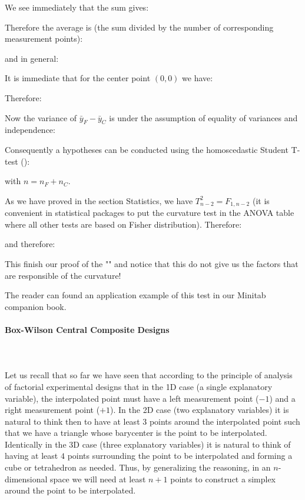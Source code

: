 	We see immediately that the sum gives:
	
	Therefore the average is (the sum divided by the number of corresponding measurement points):
	
	and in general:
	
	It is immediate that for the center point $(0,0)$ we have:
	
	Therefore:
	
	Now the variance of $\bar{y}_F-\bar{y}_C$ is under the assumption of equality of variances and independence:
	
	Consequently a hypotheses can be conducted using the homoscedastic Student T-test ():
	
	with $n=n_F+n_C$.
	
	As we have proved in the section Statistics, we have $T_{n-2}^2=F_{1,n-2}$ (it is convenient in statistical packages to put the curvature test in the ANOVA table where all other tests are based on Fisher distribution). Therefore:
	
	and therefore:
	
	This finish our proof of the "" and notice that this do not give us the factors that are responsible of the curvature!
	
	The reader can found an application example of this test in our Minitab companion book.
	
	\pagebreak
	\paragraph{Box-Wilson Central Composite Designs}\mbox{}\\\\
	Let us recall that so far we have seen that according to the principle of analysis of factorial experimental designs that in the 1D case (a single explanatory variable), the interpolated point must have a left measurement point ($-1$) and a right measurement point ($+1$). In the 2D case (two explanatory variables) it is natural to think then to have at least $3$ points around the interpolated point  such that we have a triangle whose barycenter is the point to be interpolated. Identically in the 3D case (three explanatory variables) it is natural to think of having at least $4$ points surrounding the point to be interpolated and forming a cube or tetrahedron as needed. Thus, by generalizing the reasoning, in an $n$-dimensional space we will need at least $n + 1$ points to construct a simplex around the point to be interpolated.

